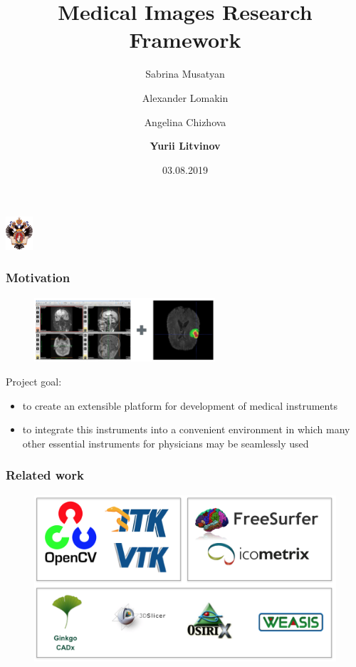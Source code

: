 \documentclass[xetex,mathserif,serif]{beamer}
\title[MIRF]{Medical Images Research Framework}
\institute[SPbSU]{Saint-Petersburg State University \\
	Software Engineering chair}
\author[Yurii Litvinov]{
Sabrina Musatyan \\
\and
Alexander Lomakin \\
\and
Angelina Chizhova \\
\and
{\bfseries Yurii Litvinov}
}
\date{03.08.2019}
\begin{document}
 

\begin{frame}
	\begin{center} 
		{\includegraphics[width=1cm]{pictures/SPbGU_Logo.png}} 
	\end{center}
	\titlepage
\end{frame}


\begin{frame}
	\frametitle{Motivation}
	\begin{figure}[b]
		\centering
		\includegraphics[width=0.6\textwidth]{pictures/brainseg.png}
	\end{figure}
	Project goal:
	\begin{itemize}
		\item to create an extensible platform for development of medical instruments
		\item to integrate this instruments  into a convenient environment in which many other essential instruments for physicians may be seamlessly used
	\end{itemize}
\end{frame}

\begin{frame}
    \frametitle{Related work}
    \begin{figure}[b]
        \centering
        \includegraphics[width=12cm]{pictures/overview.png}
    \end{figure}
\end{frame}
  
\end{document}

